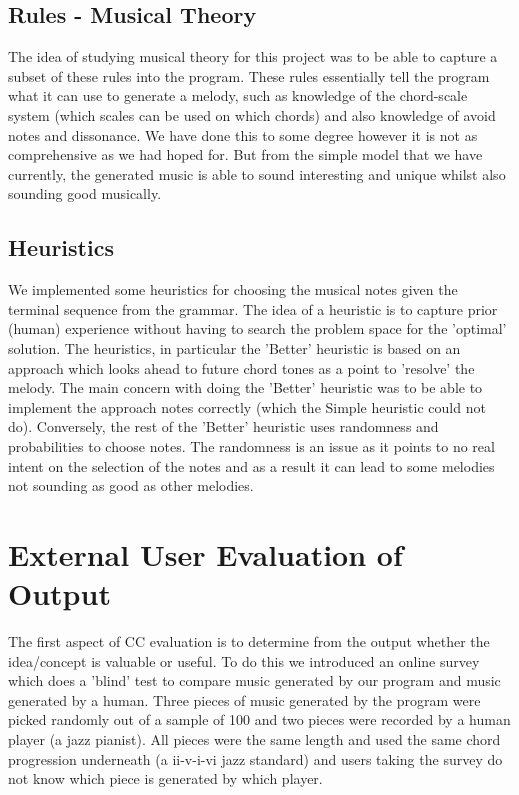 \documentclass[pdftex,12pt,a4paper]{report}
\begin{document}
\subsection{Rules - Musical Theory}
The idea of studying musical theory for this project was to be able to capture a subset of these rules into the program. These rules essentially tell the program what it can use to generate a melody, such as knowledge of the chord-scale system (which scales can be used on which chords) and also knowledge of avoid notes and dissonance. We have done this to some degree however it is not as comprehensive as we had hoped for. But from the simple model that we have currently, the generated music is able to sound interesting and unique whilst also sounding good musically.

\subsection{Heuristics}
We implemented some heuristics for choosing the musical notes given the terminal sequence from the grammar. The idea of a heuristic is to capture prior (human) experience without having to search the problem space for the 'optimal' solution. The heuristics, in particular the 'Better' heuristic is based on an approach which looks ahead to future chord tones as a point to 'resolve' the melody. The main concern with doing the 'Better' heuristic was to be able to implement the approach notes correctly (which the Simple heuristic could not do). Conversely, the rest of the 'Better' heuristic uses randomness and probabilities to choose notes. The randomness is an issue as it points to no real intent on the selection of the notes and as a result it can lead to some melodies not sounding as good as other melodies.

\section{External User Evaluation of Output}
The first aspect of CC evaluation is to determine from the output whether the idea/concept is valuable or useful. To do this we introduced an online survey which does a 'blind' test to compare music generated by our program and music generated by a human. Three pieces of music generated by the program were picked randomly out of a sample of 100 and two pieces were recorded by a human player (a jazz pianist). All pieces were the same length and used the same chord progression underneath (a ii-v-i-vi jazz standard) and users taking the survey do not know which piece is generated by which player.
\end{document}
